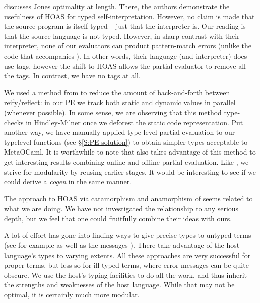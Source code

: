 \documentclass[preprint]{sigplanconf}
\begin{document}
\citet{Danvy-tagging-encoding} discusses Jones optimality at length.
There, the authors demonstrate the usefulness of HOAS for typed
self-interpretation.  However, no claim is made that the source program
is itself typed -- just that the interpreter is.  Our reading is that
the source language is not typed.  However, in sharp contrast with 
their interpreter, none of our evaluators can product pattern-match errors
(unlike the code that accompanies \citet{Danvy-tagging-encoding}).
In other words, their language (and interpreter) does use tags, however
the shift to HOAS allows the partial evaluator to remove all the tags.
In contrast, we have no tags at all.

We used a method from \citet{asai-binding-time} to reduce the amount
of back-and-forth between reify/reflect: in our PE we track both
static and dynamic values in parallel (whenever possible).  In some sense,
we are observing that this method type-checks in Hindley-Milner once we
deforest the static code representation.  Put another way, we have
manually applied type-level partial-evaluation to our typelevel 
functions (see \S\ref{S:PE-solution}) to obtain simpler types 
acceptable to MetaOCaml.  It is worthwhile to note that 
\citet{sumii-hybrid} also takes advantage of this method
\citep[of][]{asai-binding-time} to get interesting results combining online
and offline partial evaluation.  Like \citet{SperberThiemann:TwoForOne},
we strive for modularity by reusing earlier stages.  It would be interesting
to see if we could derive a \emph{cogen} \citep{Thiemann:cogeninsixlines}
in the same manner.

The approach to HOAS via catamorphism and anamorphism of
\citet{Washburn-Weirich-boxes} seems related to what we are doing.
We have not investigated the relationship to any serious depth, but we
feel that one could fruitfully combine their ideas with ours.

A lot of effort has gone into finding ways to give precise types to untyped
terms (see for example \citet{baars-typing,Guillemette-Monier-PLPV}
as well as the messages \citet{haskell-list}).  There 
take advantage of the host language's types to varying extents.  All 
these approaches are very successful for proper terms, but less so for
ill-typed terms, where error messages can be quite obscure.  We use the
host's typing facilities to do all the work, and thus inherit the strengths
and weaknesses of the host language.  While that may not be optimal, it is
certainly much more modular.
\end{document}
